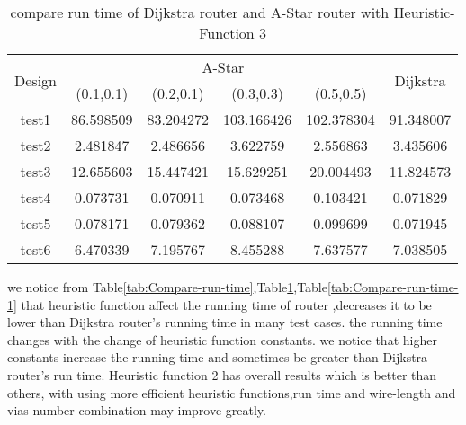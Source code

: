 \documentclass[conference]{IEEEtran}
\begin{document}
\begin{table}
{\tiny{}\caption{\label{tab:Continue-compare-run} compare run time of Dijkstra router
and A-Star router with Heuristic-Function 3}
}{\tiny\par}
\centering{}{\footnotesize{}}%
\begin{adjustbox}{width=\columnwidth,center}
\begin{tabular}{|c|c|c|c|c|c|}
\hline 
\multirow{2}{*}{{\footnotesize{}Design}} & \multicolumn{4}{c|}{{\footnotesize{}A-Star}} & \multirow{2}{*}{{\footnotesize{}Dijkstra}}\tabularnewline
\cline{2-5} \cline{3-5} \cline{4-5} \cline{5-5} 
 & {\footnotesize{}(0.1,0.1)} & {\footnotesize{}(0.2,0.1)} & {\footnotesize{}(0.3,0.3)} & {\footnotesize{}(0.5,0.5)} & \tabularnewline
\hline 
\hline 
{\footnotesize{}test1} & {\footnotesize{}86.598509} & {\footnotesize{}83.204272} & {\footnotesize{}103.166426} & {\footnotesize{}102.378304} & {\footnotesize{}91.348007}\tabularnewline
\hline 
{\footnotesize{}test2} & {\footnotesize{}2.481847} & {\footnotesize{}2.486656} & {\footnotesize{}3.622759} & {\footnotesize{}2.556863} & {\footnotesize{}3.435606}\tabularnewline
\hline 
{\footnotesize{}test3} & {\footnotesize{}12.655603} & {\footnotesize{}15.447421} & {\footnotesize{}15.629251} & {\footnotesize{}20.004493} & {\footnotesize{}11.824573}\tabularnewline
\hline 
{\footnotesize{}test4} & {\footnotesize{}0.073731} & {\footnotesize{}0.070911} & {\footnotesize{}0.073468} & {\footnotesize{}0.103421} & {\footnotesize{}0.071829}\tabularnewline
\hline 
{\footnotesize{}test5} & {\footnotesize{}0.078171} & {\footnotesize{}0.079362} & {\footnotesize{}0.088107} & {\footnotesize{}0.099699} & {\footnotesize{}0.071945}\tabularnewline
\hline 
{\footnotesize{}test6} & {\footnotesize{}6.470339} & {\footnotesize{}7.195767} & {\footnotesize{}8.455288} & {\footnotesize{}7.637577} & {\footnotesize{}7.038505}\tabularnewline
\hline 
\end{tabular}{\footnotesize\par}
\end{adjustbox}
\end{table}

we notice from Table\ref{tab:Compare-run-time},Table\ref{tab:Continue-compare-run},Table\ref{tab:Compare-run-time-1}
that heuristic function affect the running time of router ,decreases
it to be lower than Dijkstra router's running time in many test cases.
the running time changes with the change of heuristic function constants.
we notice that higher constants increase the running time and sometimes
be greater than Dijkstra router's run time. Heuristic function 2 has
overall results which is better than others, with using more efficient
heuristic functions,run time and wire-length and vias number combination
may improve greatly. 
\end{document}
